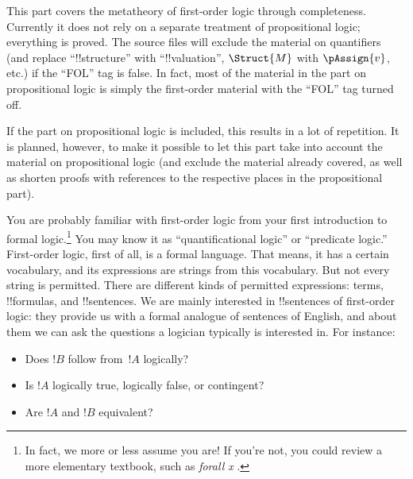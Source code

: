 




\begin{editorial}
  This part covers the metatheory of first-order logic through
  completeness.  Currently it does not rely on a separate treatment of
  propositional logic; everything is proved.  The source files will
  exclude the material on quantifiers (and replace ``!!{structure}''
  with ``!!{valuation}'', $\Struct{M}$ with $\pAssign{v}$, etc.) if
  the ``FOL'' tag is false. In fact, most of the material in the part
  on propositional logic is simply the first-order material with the
  ``FOL'' tag turned off.

  If the part on propositional logic is included, this results in a
  lot of repetition. It is planned, however, to make it possible to
  let this part take into account the material on propositional logic
  (and exclude the material already covered, as well as shorten proofs
  with references to the respective places in the propositional
  part).
\end{editorial}








You are probably familiar with first-order logic from your first
introduction to formal logic.\footnote{In fact, we more or less assume
you are!{} If you're not, you could review a more elementary textbook,
such as \emph{forall x} \citep{Magnus2021}.} You may know it as
``quantificational logic'' or ``predicate logic.''  First-order
logic, first of all, is a formal language.  That means, it has a
certain vocabulary, and its expressions are strings from this
vocabulary.  But not every string is permitted.  There are different
kinds of permitted expressions: terms, !!{formula}s, and
!!{sentence}s.  We are mainly interested in !!{sentence}s of
first-order logic: they provide us with a formal analogue of sentences
of English, and about them we can ask the questions a logician
typically is interested in. For instance: 
\begin{itemize}
    \item Does $!B$ follow from~$!A$ logically?
    \item Is $!A$ logically true, logically false, or
contingent?
    \item Are $!A$ and $!B$ equivalent?
\end{itemize}

